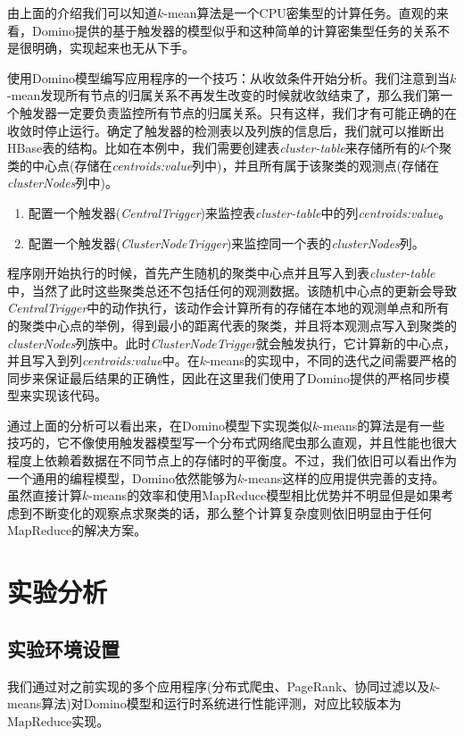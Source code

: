 由上面的介绍我们可以知道$k$-mean算法是一个CPU密集型的计算任务。直观的来看，Domino提供的基于触发器的模型似乎和这种简单的计算密集型任务的关系不是很明确，实现起来也无从下手。

使用Domino模型编写应用程序的一个技巧：从收敛条件开始分析。我们注意到当$k$-mean发现所有节点的归属关系不再发生改变的时候就收敛结束了，那么我们第一个触发器一定要负责监控所有节点的归属关系。只有这样，我们才有可能正确的在收敛时停止运行。确定了触发器的检测表以及列族的信息后，我们就可以推断出HBase表的结构。比如在本例中，我们需要创建表\textit{cluster-table}来存储所有的$k$个聚类的中心点(存储在\textit{centroids:value}列中)，并且所有属于该聚类的观测点(存储在\textit{clusterNodes}列中)。

\begin{enumerate}
\item 配置一个触发器(\textit{CentralTrigger})来监控表\textit{cluster-table}中的列\textit{centroids:value}。
\item 配置一个触发器(\textit{ClusterNodeTrigger})来监控同一个表的\textit{clusterNodes}列。
\end{enumerate}

程序刚开始执行的时候，首先产生随机的聚类中心点并且写入到表\textit{cluster-table}中，当然了此时这些聚类总还不包括任何的观测数据。该随机中心点的更新会导致\textit{CentralTrigger}中的动作执行，该动作会计算所有的存储在本地的观测单点和所有的聚类中心点的举例，得到最小的距离代表的聚类，并且将本观测点写入到聚类的\textit{clusterNodes}列族中。此时\textit{ClusterNodeTrigger}就会触发执行，它计算新的中心点，并且写入到列\textit{centroids:value}中。在$k$-means的实现中，不同的迭代之间需要严格的同步来保证最后结果的正确性，因此在这里我们使用了Domino提供的严格同步模型来实现该代码。

通过上面的分析可以看出来，在Domino模型下实现类似$k$-means的算法是有一些技巧的，它不像使用触发器模型写一个分布式网络爬虫那么直观，并且性能也很大程度上依赖着数据在不同节点上的存储时的平衡度。不过，我们依旧可以看出作为一个通用的编程模型，Domino依然能够为$k$-means这样的应用提供完善的支持。虽然直接计算$k$-means的效率和使用MapReduce模型相比优势并不明显但是如果考虑到不断变化的观察点求聚类的话，那么整个计算复杂度则依旧明显由于任何MapReduce的解决方案。


\section{实验分析}
\label{section:exp}

\subsection{实验环境设置}
我们通过对之前实现的多个应用程序(分布式爬虫、PageRank、协同过滤以及$k$-means算法)对Domino模型和运行时系统进行性能评测，对应比较版本为MapReduce实现。

